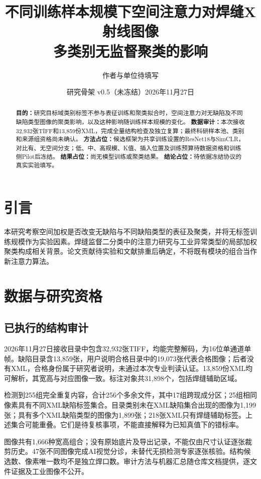 \documentclass[11pt,a4paper]{article}
\title{不同训练样本规模下空间注意力对焊缝X射线图像\\多类别无监督聚类的影响}
\author{作者与单位待填写}
\date{研究骨架 v0.5（未冻结）\quad 2026年11月27日}
\begin{document}
\maketitle
\begin{abstract}
\textbf{目的：}研究目标域类别标签不参与表征训练和聚类拟合时，空间注意力对无缺陷及不同缺陷类型图像的聚类影响，以及这种影响随训练样本规模的变化。
\textbf{数据审计：}本次接收32,932张TIFF和13,859份XML，完成全量结构检查及独立复算；最终科研样本池、类别和来源组资格尚未确认。
\textbf{方法占位：}候选框架为共享训练设置的ResNet18与SimCLR，对比有、无空间分支；低、中、高规模、K值、插入位置及训练预算待数据资格和训练侧Pilot后冻结。
\textbf{结果占位：}尚无模型训练或聚类结果。
\textbf{结论占位：}待依据冻结协议的真实实验填写。
\end{abstract}

\section{引言}
本研究考察空间加权是否改变无缺陷与不同缺陷类型的表征及聚类，并将无标签训练规模作为实验因素。焊缝监督二分类中的注意力研究\cite{wang2025attention}与工业异常类型的局部加权聚类\cite{sohn2023anomaly}构成相关背景。论文贡献待实验和文献排重后确定，不将既有模块的组合当作新注意力算法。

\section{数据与研究资格}
\subsection{已执行的结构审计}
2026年11月27日接收目录中包含32,932张TIFF，均能完整解码，为16位单通道单帧。缺陷目录含13,859张，用户说明合格目录中的19,073张代表合格图像；后者没有XML，合格身份属于研究者说明，未通过本次专业判读认证。13,859份XML均可解析，其宽高与对应图像一致。标注对象共31,898个，包括焊缝辅助区域。

检测到255组完全重复内容，合计256个多余文件，其中17组跨现成分区；25组相同像素具有不同XML缺陷标签集合。目录类别未在XML缺陷集合出现的图像为1,199张；具有多个XML缺陷类型的图像为1,899张；218张XML只有焊缝辅助标签。上述集合可能重叠。它们是待复核事项，不能直接解释为已知真值下的错标率。

图像共有1,666种宽高组合；没有原始底片及导出记录，不能仅由尺寸认证逐张裁剪历史。47张不同图像完成AI视觉分诊，未替代无损检测专家逐张核验。结构候选数、像素唯一数均不是独立焊口数。审计方法与机器汇总随仓库文档提供，逐文件证据及工业图像不公开。
\end{document}
